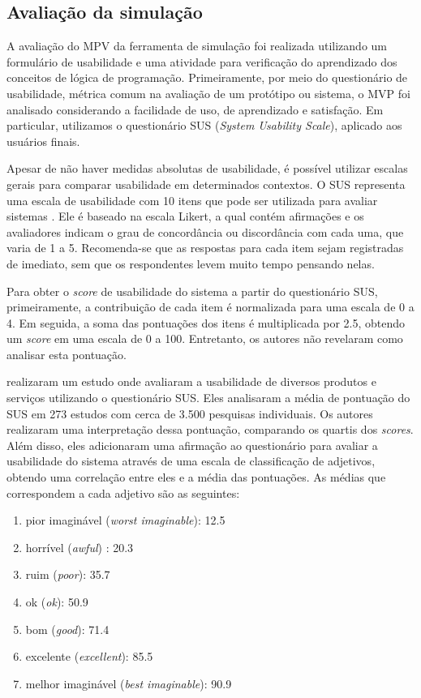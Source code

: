 \subsection{Avaliação da simulação}
A avaliação do MPV da ferramenta de simulação foi realizada utilizando um formulário de usabilidade e uma atividade para verificação do aprendizado dos conceitos de lógica de programação. Primeiramente, por meio do questionário de usabilidade, métrica comum na avaliação de um protótipo ou sistema, o MVP foi analisado considerando a facilidade de uso, de aprendizado e satisfação. Em particular, utilizamos o questionário SUS (\textit{System Usability Scale}), aplicado aos usuários finais.

Apesar de não haver medidas absolutas de usabilidade, é possível utilizar escalas gerais para comparar usabilidade em determinados contextos. O SUS representa uma escala de usabilidade com 10 itens que pode ser utilizada para avaliar sistemas \citep{brooke1996sus}. Ele é baseado na escala Likert, a qual contém afirmações e os avaliadores indicam o grau de concordância ou discordância com cada uma, que varia de 1 a 5. Recomenda-se que as respostas para cada item sejam registradas de imediato, sem que os respondentes levem muito tempo pensando nelas.

Para obter o \textit{score} de usabilidade do sistema a partir do questionário SUS, primeiramente, a contribuição de cada item é normalizada para uma escala de 0 a 4. Em seguida, a soma das pontuações dos itens é multiplicada por 2.5, obtendo um \textit{score} em uma escala de 0 a 100. Entretanto, os autores não revelaram como analisar esta pontuação.

\citet{bangor2008empirical, bangor2009determining} realizaram um estudo onde avaliaram a usabilidade de diversos produtos e serviços utilizando o questionário SUS. Eles analisaram a média de pontuação do SUS em 273 estudos com cerca de 3.500 pesquisas individuais. Os autores realizaram uma interpretação dessa pontuação, comparando os quartis dos \textit{scores}. Além disso, eles adicionaram uma afirmação ao questionário para avaliar a usabilidade do sistema através de uma escala de classificação de adjetivos, obtendo uma correlação entre eles e a média das pontuações. As médias que correspondem a cada adjetivo são as seguintes:

\begin{enumerate}
    \item pior imaginável (\textit{worst imaginable}): 12.5
    \item horrível (\textit{awful}) : 20.3
    \item ruim (\textit{poor}): 35.7
    \item ok (\textit{ok}): 50.9
    \item bom (\textit{good}): 71.4
    \item excelente (\textit{excellent}): 85.5
    \item melhor imaginável (\textit{best imaginable}): 90.9
\end{enumerate}

